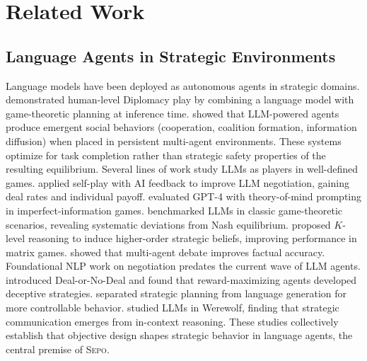 \documentclass[letterpaper]{article} %
\newcommand{\sepo}{\textsc{Sepo}}
\begin{document}
\section{Related Work}
\label{sec:related}
\subsection{Language Agents in Strategic Environments}
Language models have been deployed as autonomous agents in strategic domains. \citet{bakhtin2022human} demonstrated human-level Diplomacy play by combining a language model with game-theoretic planning at inference time. \citet{park2023generative} showed that LLM-powered agents produce emergent social behaviors (cooperation, coalition formation, information diffusion) when placed in persistent multi-agent environments. These systems optimize for task completion rather than strategic safety properties of the resulting equilibrium.
Several lines of work study LLMs as players in well-defined games. \citet{fu2023improving} applied self-play with AI feedback to improve LLM negotiation, gaining deal rates and individual payoff. \citet{guo2023suspicion} evaluated GPT-4 with theory-of-mind prompting in imperfect-information games. \citet{mao2025alympics} benchmarked LLMs in classic game-theoretic scenarios, revealing systematic deviations from Nash equilibrium. \citet{zhang2025klevel} proposed $K$-level reasoning to induce higher-order strategic beliefs, improving performance in matrix games. \citet{du2024improving} showed that multi-agent debate improves factual accuracy.
Foundational NLP work on negotiation predates the current wave of LLM agents. \citet{lewis2017deal} introduced Deal-or-No-Deal and found that reward-maximizing agents developed deceptive strategies. \citet{he2018decoupling} separated strategic planning from language generation for more controllable behavior. \citet{xu2023exploring} studied LLMs in Werewolf, finding that strategic communication emerges from in-context reasoning. These studies collectively establish that objective design shapes strategic behavior in language agents, the central premise of \sepo{}.
\end{document}
